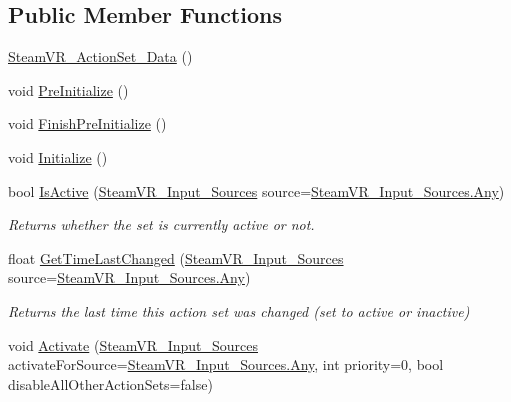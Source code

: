 \subsection*{Public Member Functions}
\begin{DoxyCompactItemize}
\item 
\mbox{\hyperlink{class_valve_1_1_v_r_1_1_steam_v_r___action_set___data_a9a42fdc5c1399070dfcab2007a15ce05}{Steam\+V\+R\+\_\+\+Action\+Set\+\_\+\+Data}} ()
\item 
void \mbox{\hyperlink{class_valve_1_1_v_r_1_1_steam_v_r___action_set___data_aa8f10fb84c2bb84d8d397bca87a26448}{Pre\+Initialize}} ()
\item 
void \mbox{\hyperlink{class_valve_1_1_v_r_1_1_steam_v_r___action_set___data_a22949235abc84877f74d3b31a853d4d6}{Finish\+Pre\+Initialize}} ()
\item 
void \mbox{\hyperlink{class_valve_1_1_v_r_1_1_steam_v_r___action_set___data_a6a9598330da834f7f477b76a5b2f73c2}{Initialize}} ()
\item 
bool \mbox{\hyperlink{class_valve_1_1_v_r_1_1_steam_v_r___action_set___data_a6965315cd2efbcf52a7aa7989c0056ec}{Is\+Active}} (\mbox{\hyperlink{namespace_valve_1_1_v_r_a82e5bf501cc3aa155444ee3f0662853f}{Steam\+V\+R\+\_\+\+Input\+\_\+\+Sources}} source=\mbox{\hyperlink{namespace_valve_1_1_v_r_a82e5bf501cc3aa155444ee3f0662853faed36a1ef76a59ee3f15180e0441188ad}{Steam\+V\+R\+\_\+\+Input\+\_\+\+Sources.\+Any}})
\begin{DoxyCompactList}\small\item\em Returns whether the set is currently active or not. \end{DoxyCompactList}\item 
float \mbox{\hyperlink{class_valve_1_1_v_r_1_1_steam_v_r___action_set___data_ac46c58ac022a390e56338df2c469c79a}{Get\+Time\+Last\+Changed}} (\mbox{\hyperlink{namespace_valve_1_1_v_r_a82e5bf501cc3aa155444ee3f0662853f}{Steam\+V\+R\+\_\+\+Input\+\_\+\+Sources}} source=\mbox{\hyperlink{namespace_valve_1_1_v_r_a82e5bf501cc3aa155444ee3f0662853faed36a1ef76a59ee3f15180e0441188ad}{Steam\+V\+R\+\_\+\+Input\+\_\+\+Sources.\+Any}})
\begin{DoxyCompactList}\small\item\em Returns the last time this action set was changed (set to active or inactive) \end{DoxyCompactList}\item 
void \mbox{\hyperlink{class_valve_1_1_v_r_1_1_steam_v_r___action_set___data_ad085a17ebd6286a224d27d38ac913597}{Activate}} (\mbox{\hyperlink{namespace_valve_1_1_v_r_a82e5bf501cc3aa155444ee3f0662853f}{Steam\+V\+R\+\_\+\+Input\+\_\+\+Sources}} activate\+For\+Source=\mbox{\hyperlink{namespace_valve_1_1_v_r_a82e5bf501cc3aa155444ee3f0662853faed36a1ef76a59ee3f15180e0441188ad}{Steam\+V\+R\+\_\+\+Input\+\_\+\+Sources.\+Any}}, int priority=0, bool disable\+All\+Other\+Action\+Sets=false)

\end{DoxyCompactItemize}

